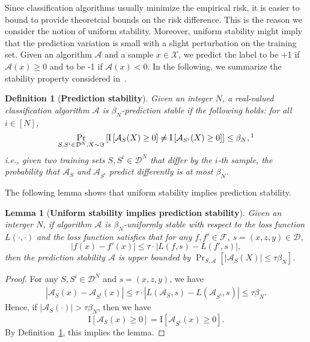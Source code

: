 \documentclass[11pt]{article}
\newtheorem{lemma}[theorem]{Lemma}
\newtheorem{definition}[theorem]{Definition}
\newcommand{\I}{\mathrm{I}}
\newcommand{\calA}{\mathcal{A}}
\newcommand{\calD}{\mathcal{D}}
\newcommand{\calF}{\mathcal{F}}
\newcommand{\calX}{\mathcal{X}}
\begin{document}
	Since classification algorithms usually minimize the empirical risk, it is easier to bound to provide theoretcial bounds on the risk difference.
	This is the reason  we consider the notion of uniform stability.
	Moreover, uniform stability might imply that the prediction variation is small with a slight perturbation on the training set. 
	Given an algorithm $\calA$ and a sample $x\in \calX$, we predict the label to be +1 if $\calA(x)\geq 0$ and to be -1 if $\calA(x)< 0$.
	In the following, we summarize the stability property considered in~\cite{friedler2018comparative}. 
	\begin{definition}[\textbf{Prediction stability}]
		\label{def:predict_stability}
		Given an integer $N$, a real-valued classification algorithm $\calA$ is $\beta_N$-prediction stable if the following holds: for all $i\in [N]$,
		\begin{eqnarray*}
			\Pr_{S, S^i\in \calD^N, X\sim \Im}\left[\I\left[\calA_S(X)\geq 0\right]\neq  \I\left[\calA_{S^i}(X)\geq 0\right] \right] \leq \beta_N,\footnotemark
		\end{eqnarray*}
		\footnotetext{Here, $\I\left[\cdot\right]$ is the indicator function.}
		i.e., given two training sets $S, S^i\in \calD^N$ that differ by the $i$-th sample, the probability that $\calA_S$ and $\calA_{S^i}$ predict differently is at most $\beta_N$.
	\end{definition}
	The following lemma shows that uniform stability implies prediction stability.
	
	\begin{lemma}[\textbf{Uniform stability implies prediction stability}]
		\label{thm:uniform_to_prediction}
		Given an interger $N$, if algorithm $\calA$ is $\beta_N$-uniformly stable with respect to the loss function $L(\cdot,\cdot)$ and the loss function satisfies that for any $f,f'\in \calF$, $s=(x,z,y)\in \calD$, 
		\[
		|f(x)-f'(x)|\leq \tau\cdot\left|L(f,s)-L(f',s)\right|,
		\]
		then the prediction stability $\calA$ is upper bounded by
		$\Pr_{S,\calA}\left[|\calA_S(X)|\leq \tau \beta_N\right]$.
	\end{lemma}
	\begin{proof}
		For any $S, S^i\in \calD^N$ and $s=(x,z,y)$, we have
		\begin{eqnarray*}
			\left|\calA_S(x)-\calA_{S^i}(x)\right|\leq \tau\cdot \left|L(\calA_S,s)-L(\calA_{S^i},s) \right| \leq \tau\beta_N.
		\end{eqnarray*}
		Hence, if $|\calA_S(\cdot)|> \tau \beta_N$, then we have
		\[
		\I\left[\calA_S(x)\geq 0\right]=  \I\left[\calA_{S^i}(x)\geq 0\right].
		\]
		By Definition~\ref{def:predict_stability}, this implies the lemma.
	\end{proof}
	
\end{document}
